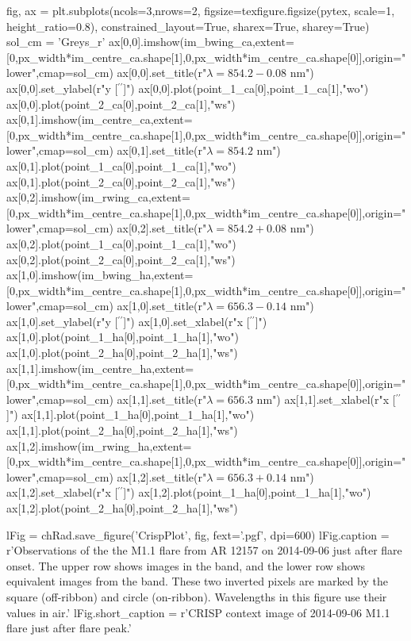 \begin{pycode}[Radynversion]
fig, ax = plt.subplots(ncols=3,nrows=2,
figsize=texfigure.figsize(pytex, scale=1, height_ratio=0.8),
constrained_layout=True, sharex=True, sharey=True)
sol_cm = 'Greys_r'
ax[0,0].imshow(im_bwing_ca,extent=[0,px_width*im_centre_ca.shape[1],0,px_width*im_centre_ca.shape[0]],origin="lower",cmap=sol_cm)
ax[0,0].set_title(r"$\lambda=854.2-0.08$ nm")
ax[0,0].set_ylabel(r"y [$^{\prime\prime}$]")
ax[0,0].plot(point_1_ca[0],point_1_ca[1],"wo")
ax[0,0].plot(point_2_ca[0],point_2_ca[1],"ws")
ax[0,1].imshow(im_centre_ca,extent=[0,px_width*im_centre_ca.shape[1],0,px_width*im_centre_ca.shape[0]],origin="lower",cmap=sol_cm)
ax[0,1].set_title(r"$\lambda=854.2$ nm")
ax[0,1].plot(point_1_ca[0],point_1_ca[1],"wo")
ax[0,1].plot(point_2_ca[0],point_2_ca[1],"ws")
ax[0,2].imshow(im_rwing_ca,extent=[0,px_width*im_centre_ca.shape[1],0,px_width*im_centre_ca.shape[0]],origin="lower",cmap=sol_cm)
ax[0,2].set_title(r"$\lambda=854.2+0.08$ nm")
ax[0,2].plot(point_1_ca[0],point_1_ca[1],"wo")
ax[0,2].plot(point_2_ca[0],point_2_ca[1],"ws")
ax[1,0].imshow(im_bwing_ha,extent=[0,px_width*im_centre_ca.shape[1],0,px_width*im_centre_ca.shape[0]],origin="lower",cmap=sol_cm)
ax[1,0].set_title(r"$\lambda=656.3-0.14$ nm")
ax[1,0].set_ylabel(r"y [$^{\prime\prime}$]")
ax[1,0].set_xlabel(r"x [$^{\prime\prime}$]")
ax[1,0].plot(point_1_ha[0],point_1_ha[1],"wo")
ax[1,0].plot(point_2_ha[0],point_2_ha[1],"ws")
ax[1,1].imshow(im_centre_ha,extent=[0,px_width*im_centre_ca.shape[1],0,px_width*im_centre_ca.shape[0]],origin="lower",cmap=sol_cm)
ax[1,1].set_title(r"$\lambda=656.3$ nm")
ax[1,1].set_xlabel(r"x [$^{\prime\prime}$]")
ax[1,1].plot(point_1_ha[0],point_1_ha[1],"wo")
ax[1,1].plot(point_2_ha[0],point_2_ha[1],"ws")
ax[1,2].imshow(im_rwing_ha,extent=[0,px_width*im_centre_ca.shape[1],0,px_width*im_centre_ca.shape[0]],origin="lower",cmap=sol_cm)
ax[1,2].set_title(r"$\lambda=656.3+0.14$ nm")
ax[1,2].set_xlabel(r"x [$^{\prime\prime}$]")
ax[1,2].plot(point_1_ha[0],point_1_ha[1],"wo")
ax[1,2].plot(point_2_ha[0],point_2_ha[1],"ws")

lFig = chRad.save_figure('CrispPlot', fig, fext='.pgf', dpi=600)
lFig.caption = r'Observations of the the M1.1 flare from AR 12157 on 2014-09-06 just after flare onset. The upper row shows images in the \CaLine{} band, and the lower row shows equivalent images from the \Ha{} band. These two inverted pixels are marked by the square (off-ribbon) and circle (on-ribbon). Wavelengths in this figure use their values in air.'
lFig.short_caption = r'CRISP context image of 2014-09-06 M1.1 flare just after flare peak.'
\end{pycode}

